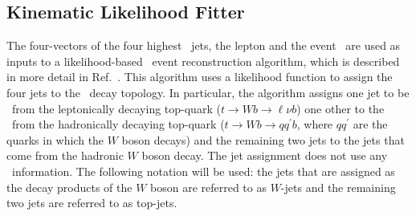 \documentclass[letterpaper,12pt]{article}
\begin{document}
\subsection{Kinematic Likelihood Fitter}
\label{KLFitter}
The four-vectors of the four highest \pt\ jets, the lepton and the
event \MET\ are used as inputs to a likelihood-based \ttbar\ event
reconstruction algorithm, which is described in more detail in
Ref.~\cite{ERDMANN201418}. This algorithm uses a likelihood function
to assign the four jets to the \ttbar\ decay topology. In particular,
the algorithm assigns one jet to be \bjet\ from the leptonically
decaying top-quark ($t\to Wb \to \ell \nu b$) one other to the \bjet\
from the hadronically decaying top-quark ($t\to Wb \to qq^\prime b$,
where $qq^\prime$ are the quarks in which the $W$ boson decays) and
the remaining two jets to the jets that come from the hadronic $W$
boson decay. The jet assignment does not use any \btagging\ information.
The following notation will be used: the jets that are
assigned as the decay products of the $W$ boson are referred to as
$W$-jets and the remaining two jets are referred to as top-jets.
\end{document}
